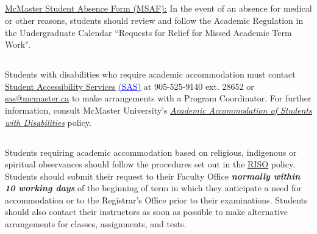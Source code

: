 \documentclass[hidelinks,11pt]{article}
\begin{document}
\subsection*{{}}
\href{https://secretariat.mcmaster.ca/university-policies-procedures-guidelines/msaf-mcmaster-student-absence-form/}{\underline{McMaster Student Absence Form (MSAF):}} In the event of an absence for medical or other reasons, students should review and follow the Academic Regulation in the Undergraduate Calendar ``Requests for Relief for Missed Academic Term Work".

\subsection*{{}}
Students with disabilities who require academic accommodation must contact \href{https://sas.mcmaster.ca}{\underline{Student Accessibility Services}} \textcolor{blue}{\underline{(SAS)}} at 905-525-9140 ext. 28652 or \href{mailto:sas@mcmaster.ca}{\underline{sas@mcmaster.ca}} to make arrangements with a Program Coordinator. For further information, consult McMaster University’s \href{https://secretariat.mcmaster.ca/app/uploads/Academic-Accommodations-Policy.pdf}{\underline{\emph{Academic Accommodation of Students with Disabilities}}} policy.

\subsection*{{}}
Students requiring academic accommodation based on religious, indigenous or spiritual observances should follow the procedures set out in the \href{https://secretariat.mcmaster.ca/app/uploads/2019/02/Academic-Accommodation-for-Religious-Indigenous-and-Spiritual-Observances-Policy-on.pdf}{\underline{RISO}} policy. Students should submit their request to their Faculty Office \textbf{\emph{normally within 10 working days}} of the beginning of term in which they anticipate a need for accommodation or to the Registrar's Office prior to their examinations. Students should also contact their instructors as soon as possible to make alternative arrangements for classes, assignments, and tests.
\end{document}
